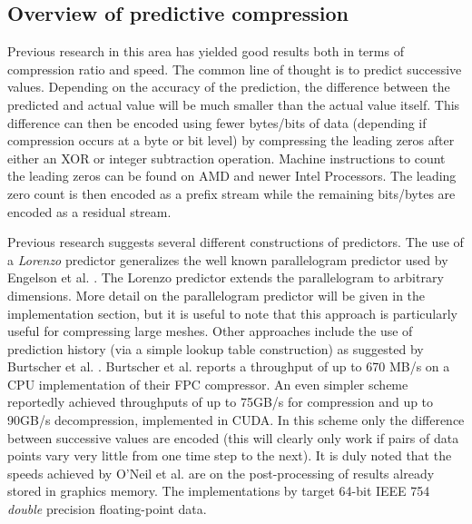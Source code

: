 \subsection{Overview of predictive compression}
Previous research \cite{1607248,4589203,engelson2000lossless,lindstrom2006fast,O'Neil:2011:FDC:1964179.1964189,4976448} in this area has yielded good results both in terms of compression ratio and speed. 
The common line of thought is to predict successive values. Depending on the accuracy of the prediction, the difference between the predicted and actual value will be much smaller than the actual value itself. 
This difference can then be encoded using fewer bytes/bits of data (depending if compression occurs at a byte or bit level) by compressing the leading zeros after either an XOR or integer subtraction 
operation. Machine instructions to count the leading zeros can be found on AMD and newer Intel Processors. The leading zero count is then encoded as a prefix stream while the remaining bits/bytes 
are encoded as a residual stream.

Previous research suggests several different constructions of predictors. The use of a \textit{Lorenzo} predictor \cite{lindstrom2006fast} generalizes the well known parallelogram predictor used by 
Engelson et al. \cite{engelson2000lossless}. The Lorenzo predictor extends the parallelogram to arbitrary dimensions. More detail on the parallelogram predictor will be given
in the implementation section, but it is useful to note that this approach is particularly useful for compressing large meshes. Other approaches include the use of prediction history 
(via a simple lookup table construction) as suggested by Burtscher et al. \cite{1607248,4589203,4976448}. Burtscher et al. reports a throughput of up to 670 MB/s on a CPU implementation of their FPC 
compressor. An even simpler scheme \cite{O'Neil:2011:FDC:1964179.1964189} reportedly achieved throughputs of up to 75GB/s for compression and up to 90GB/s 
decompression, implemented in CUDA. In this scheme only the difference between successive values are encoded (this will clearly only work if pairs of data points 
vary very little from one time step to the next). It is duly noted that the speeds achieved by O'Neil et al. \cite{O'Neil:2011:FDC:1964179.1964189} are on the post-processing of 
results already stored in graphics memory. The implementations by \cite{O'Neil:2011:FDC:1964179.1964189,1607248,4589203,4976448,engelson2000lossless} target 64-bit IEEE 754 
\textit{double} precision floating-point data.

